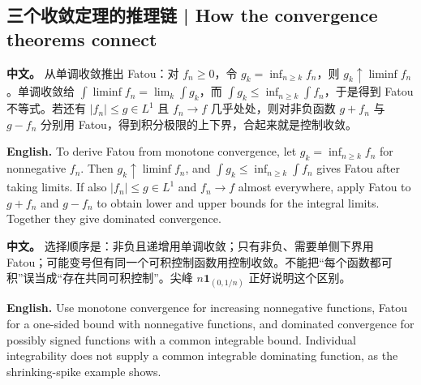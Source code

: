\documentclass[UTF8,11pt,a4paper]{ctexart}
\let\APSsubsection\subsection
\renewcommand{\subsection}[1]{\Needspace{6\baselineskip}\APSsubsection{#1}}
\newcommand{\APS}[2]{\par\noindent\textbf{中文。} #1\par\noindent\textbf{English.} #2\par\smallskip}
\begin{document}
\subsection{三个收敛定理的推理链 | How the convergence theorems connect}
\APS{从单调收敛推出 Fatou：对 $f_n\ge0$，令 $g_k=\inf_{n\ge k}f_n$，则 $g_k\uparrow\liminf f_n$。单调收敛给 $\int\liminf f_n=\lim_k\int g_k$，而 $\int g_k\le\inf_{n\ge k}\int f_n$，于是得到 Fatou 不等式。若还有 $|f_n|\le g\in L^1$ 且 $f_n\to f$ 几乎处处，则对非负函数 $g+f_n$ 与 $g-f_n$ 分别用 Fatou，得到积分极限的上下界，合起来就是控制收敛。}{To derive Fatou from monotone convergence, let $g_k=\inf_{n\ge k}f_n$ for nonnegative $f_n$. Then $g_k\uparrow\liminf f_n$, and $\int g_k\le\inf_{n\ge k}\int f_n$ gives Fatou after taking limits. If also $|f_n|\le g\in L^1$ and $f_n\to f$ almost everywhere, apply Fatou to $g+f_n$ and $g-f_n$ to obtain lower and upper bounds for the integral limits. Together they give dominated convergence.}
\APS{选择顺序是：非负且递增用单调收敛；只有非负、需要单侧下界用 Fatou；可能变号但有同一个可积控制函数用控制收敛。不能把“每个函数都可积”误当成“存在共同可积控制”。尖峰 $n\mathbf1_{(0,1/n)}$ 正好说明这个区别。}{Use monotone convergence for increasing nonnegative functions, Fatou for a one-sided bound with nonnegative functions, and dominated convergence for possibly signed functions with a common integrable bound. Individual integrability does not supply a common integrable dominating function, as the shrinking-spike example shows.}
\end{document}

